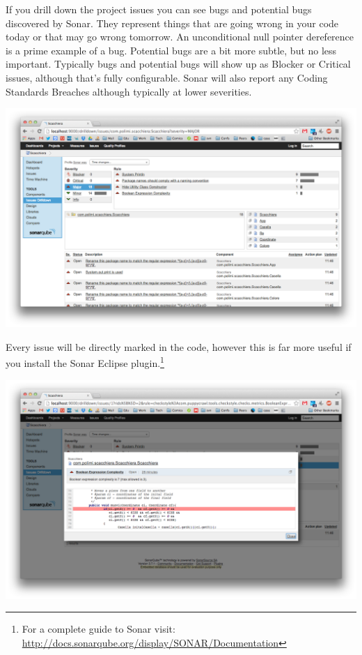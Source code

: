 \documentclass{article}
\begin{document}
If you drill down the project issues you can see bugs and potential
bugs discovered by Sonar. They represent things that are going wrong
in your code today or that may go wrong tomorrow. An unconditional
null pointer dereference is a prime example
of a bug. Potential bugs are a bit more subtle, but no less important. 
Typically bugs and potential bugs will show up as Blocker or Critical issues,
although that's fully configurable. 
Sonar will also report any Coding Standards Breaches although
typically at lower severities.
\begin{center}
\includegraphics[scale=0.3]{figures/ss3.png}
\end{center}

Every issue will be directly marked in the code, however this is far
more useful if you install the Sonar Eclipse plugin.\footnote{For a
  complete guide to Sonar visit:
\url{http://docs.sonarqube.org/display/SONAR/Documentation}}
\begin{center}
\includegraphics[scale=0.3]{figures/ss4.png}
\end{center}
\end{document}
